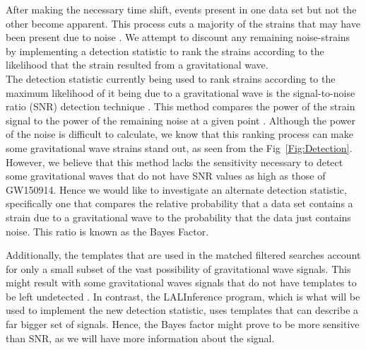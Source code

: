\documentclass{article}
\begin{document}
    After making the necessary time shift, events present in one data set but not the other become apparent. This process cuts a majority of the strains that may have been present due to noise \cite{DetectionPaper}. We attempt to discount any remaining noise-strains by implementing a detection statistic to rank the strains according to the likelihood that the strain resulted from a gravitational wave.\\
  
  
  \indent The detection statistic currently being used to rank strains according to the maximum likelihood of it being due to a gravitational wave is the signal-to-noise ratio (SNR) detection technique \cite{Enia}. This method compares the power of the strain signal to the power of the remaining noise at a given point \cite{RSmith}. Although the power of the noise is difficult to calculate, we know that this ranking process can make some gravitational wave strains stand out, as seen from the Fig~\ref{Fig:Detection}.  However, we believe that this method lacks the sensitivity necessary to detect some gravitational waves that do not have SNR values as high as those of GW150914. Hence we would like to investigate an alternate detection statistic, specifically one that compares the relative probability that a data set contains a strain due to a gravitational wave to the probability that the data just contains noise. This ratio is known as the Bayes Factor.
  
  
  Additionally, the templates that are used in the matched filtered searches account for only a small subset of the vast possibility of gravitational wave signals. This might result with some gravitational waves signals that do not have templates to be left undetected .  In contrast, the LALInference program, which is what will be used to implement the new detection statistic, uses templates that can describe a far bigger set of signals. Hence, the Bayes factor might prove to be more sensitive than SNR, as we will have more information about the signal.
  
  
  
\end{document}
